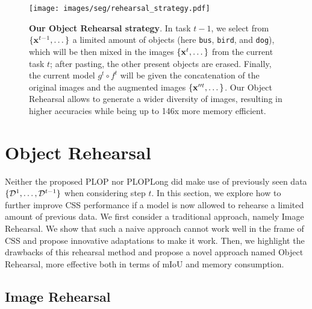 \begin{figure}[ht!]
    \centering
    \texttt{[image: images/seg/rehearsal\_strategy.pdf]}
    \caption{\textbf{Our Object Rehearsal strategy}. In task $t-1$, we select from $\{\mathbf{x}^{t-1},
            \dots \}$ a limited amount of objects (here \texttt{bus}, \texttt{bird}, and
        \texttt{dog}), which will be then mixed in the images $\{\mathbf{x}^{t}, \dots \}$ from the
        current task $t$; after pasting, the other present objects are erased. Finally, the
        current model $g^t \circ f^t$ will be given the concatenation of the original images
        and the augmented images $\{\mathbf{x}''^t, \dots\}$. Our Object Rehearsal allows to generate
        a wider diversity of images, resulting in higher accuracies while being up to 146x more
        memory efficient.}
    \label{fig:seg_model_objectrehearsal}
\end{figure}


\section{Object Rehearsal}
\label{sec:seg_rehearsal}

Neither the proposed PLOP nor PLOPLong did make use of previously seen data $\{\mathcal{D}^{1}, \dots,
    \mathcal{D}^{t-1}\}$ when considering step $t$. In this section, we explore how to further improve \ac{CSS}
performance if a model is now allowed to rehearse a limited amount of previous data. We first
consider a traditional approach, namely Image Rehearsal. We show that such a naive approach
cannot work well in the frame of \ac{CSS} and propose innovative adaptations to make it work. Then,
we highlight the drawbacks of this rehearsal method and propose a novel approach named Object
Rehearsal, more effective both in terms of \ac{mIoU} and memory consumption.

\subsection{Image Rehearsal}
\label{sec:seg_image_rehearsal}

